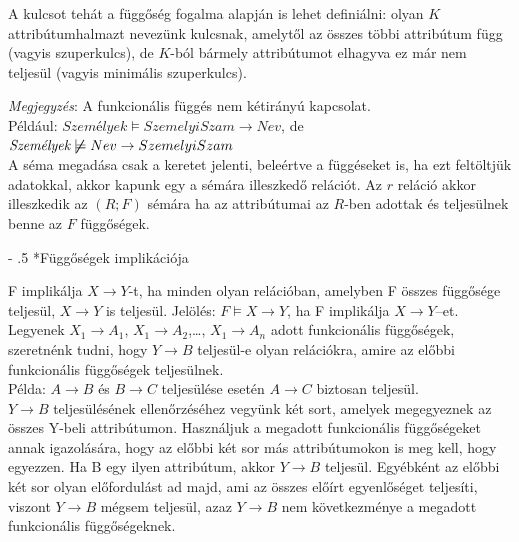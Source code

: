 \documentclass[tikz,12pt,margin=0px]{article}
\makeatletter
\renewcommand\paragraph{%
	\@startsection{paragraph}{4}{0mm}%
	{-\baselineskip}%
	{.5\baselineskip}%
	{\normalfont\normalsize\bfseries}}
\makeatother
\begin{document}
{    \noindent A kulcsot tehát a függőség fogalma alapján is lehet definiálni: olyan $K$ attribútumhalmazt nevezünk kulcsnak, amelytől az összes többi attribútum függ (vagyis szuperkulcs), de $K$-ból bármely attribútumot elhagyva ez már nem teljesül (vagyis minimális szuperkulcs).

    \noindent \emph{Megjegyzés}: A funkcionális függés nem kétirányú kapcsolat.\\
    Például: $\textit{Személyek} \models SzemelyiSzam \to Nev$, de $\textit{Személyek} \boldsymbol{\not} \models Nev \to SzemelyiSzam$\\

    \noindent A séma megadása csak a keretet jelenti, beleértve a függéseket is, ha ezt feltöltjük adatokkal, akkor kapunk egy a sémára illeszkedő relációt. Az $r$ reláció akkor illeszkedik az $(R; F)$ sémára ha az attribútumai az $R$-ben adottak és teljesülnek benne az $F$ függőségek.

    \paragraph*{Függőségek implikációja\\}

    F implikálja $X \to Y$-t, ha minden olyan relációban, amelyben F összes függősége teljesül, $X \to Y$ is teljesül. Jelölés: $F \models X \to Y$, ha F implikálja $X \to Y$–et. \\

    \noindent Legyenek $X_1 \to A_1$, $X_1 \to A_2$,\ldots, $X_1 \to A_n$ adott funkcionális függőségek, szeretnénk tudni, hogy $Y \to B$ teljesül-e olyan relációkra, amire az előbbi funkcionális függőségek teljesülnek. \\
\newpage
    \noindent Példa: $A \to B$ és $B \to C$ teljesülése esetén $A \to C$ biztosan teljesül. \\

    \noindent $Y \to B$ teljesülésének ellenőrzéséhez vegyünk két sort, amelyek megegyeznek az összes Y-beli attribútumon. Használjuk a megadott funkcionális függőségeket annak igazolására, hogy az előbbi két sor más attribútumokon is meg kell, hogy egyezzen.
    Ha B egy ilyen attribútum, akkor $Y \to B$ teljesül. Egyébként az előbbi két sor olyan előfordulást ad majd, ami az összes előírt egyenlőséget teljesíti, viszont $Y \to B$ mégsem teljesül, azaz $Y \to B$ nem következménye a megadott funkcionális függőségeknek. \\

}
\end{document}
